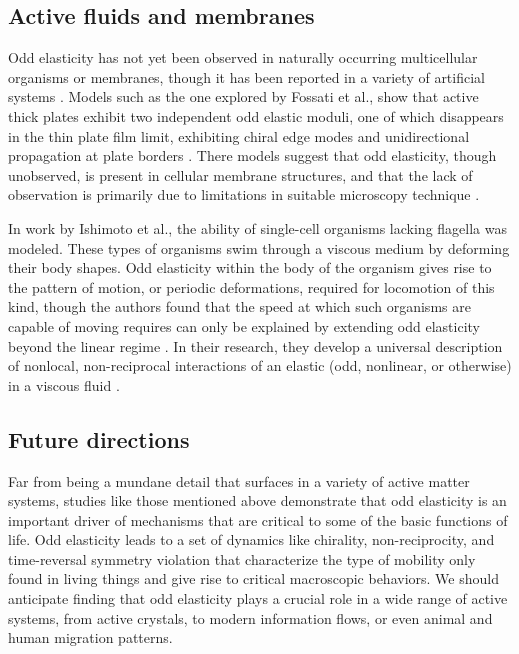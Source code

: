 \subsection*{Active fluids and membranes}

Odd elasticity has not yet been observed in naturally occurring multicellular organisms \cite{tan2022odd} or membranes, though it has been reported in a variety of artificial systems \cite{fossati2024odd}.  Models such as the one explored by Fossati et al., show that active thick plates exhibit two independent odd elastic moduli, one of which disappears in the thin plate film limit, exhibiting chiral edge modes and unidirectional propagation at plate borders \cite{fossati2024odd}.  There models suggest that odd elasticity, though unobserved, is present in cellular membrane structures, and that the lack of observation is primarily due to limitations in suitable microscopy technique \cite{fossati2024odd}.

In work by Ishimoto et al., the ability of single-cell organisms lacking flagella was modeled.  These types of organisms swim through a viscous medium by deforming their body shapes.  Odd elasticity within the body of the organism gives rise to the pattern of motion, or periodic deformations, required for locomotion of this kind, though the authors found that the speed at which such organisms are capable of moving requires can only be explained by extending odd elasticity beyond the linear regime \cite{ishimoto2023odd}.  In their research, they develop a universal description of nonlocal, non-reciprocal interactions of an elastic (odd, nonlinear, or otherwise) in a viscous fluid \cite{ishimoto2023odd}.

\subsection*{Future directions}

Far from being a mundane detail that surfaces in a variety of active matter systems, studies like those mentioned above \cite{tan2022odd, fossati2024odd, ishimoto2023odd, choi2024noise} demonstrate that odd elasticity is an important driver of mechanisms that are critical to some of the basic functions of life.  Odd elasticity leads to a set of dynamics like chirality, non-reciprocity, and time-reversal symmetry violation that characterize the type of mobility only found in living things and give rise to critical macroscopic behaviors.  We should anticipate finding that odd elasticity plays a crucial role in a wide range of active systems, from active crystals, to modern information flows, or even animal and human migration patterns.
